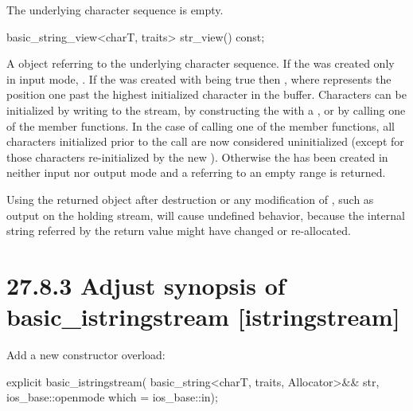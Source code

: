\documentclass[ebook,11pt,article]{memoir}
\begin{document}
\begin{insrt}
\begin{itemdescr}
\pnum
\postcondition The underlying character sequence is empty.
\end{itemdescr}

\begin{itemdecl}
basic_string_view<charT, traits> str_view() const;
\end{itemdecl}
\begin{itemdescr}
\pnum
\returns A  object referring to the  underlying character sequence. If the  was created only in input mode,  . If the  was created with  being true then , where  represents the position one past the highest initialized character in the buffer. Characters can be initialized by writing to the stream, by constructing the  with a , or by calling one of the  member functions. In the case of calling one of the  member functions, all characters initialized prior to the call are now considered uninitialized (except for those characters re-initialized by the new ). Otherwise the  has been created in neither input nor output mode and a  referring to an empty range is returned. 

\pnum
\enternote
Using the returned object after destruction or any modification of , such as output on the holding stream, will cause undefined behavior, because the internal string referred by the return value might have changed or re-allocated. 
\exitnote
\end{itemdescr}

\end{insrt}
\section{27.8.3 Adjust synopsis of basic\_istringstream [istringstream]}
Add a new constructor overload:
\begin{insrt}
\begin{codeblock}
           explicit basic_istringstream(
             basic_string<charT, traits, Allocator>&& str,
             ios_base::openmode which = ios_base::in);
\end{codeblock}
\end{insrt}
\end{document}
